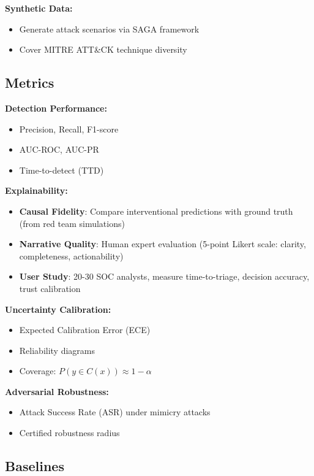 \documentclass[conference]{IEEEtran}
\begin{document}
\textbf{Synthetic Data:}
\begin{itemize}
    \item Generate attack scenarios via SAGA framework \cite{saga}
    \item Cover MITRE ATT\&CK technique diversity
\end{itemize}

\subsection{Metrics}

\textbf{Detection Performance:}
\begin{itemize}
    \item Precision, Recall, F1-score
    \item AUC-ROC, AUC-PR
    \item Time-to-detect (TTD)
\end{itemize}

\textbf{Explainability:}
\begin{itemize}
    \item \textbf{Causal Fidelity}: Compare interventional predictions with ground truth (from red team simulations)
    \item \textbf{Narrative Quality}: Human expert evaluation (5-point Likert scale: clarity, completeness, actionability)
    \item \textbf{User Study}: 20-30 SOC analysts, measure time-to-triage, decision accuracy, trust calibration
\end{itemize}

\textbf{Uncertainty Calibration:}
\begin{itemize}
    \item Expected Calibration Error (ECE)
    \item Reliability diagrams
    \item Coverage: $P(y \in C(x)) \approx 1-\alpha$
\end{itemize}

\textbf{Adversarial Robustness:}
\begin{itemize}
    \item Attack Success Rate (ASR) under mimicry attacks
    \item Certified robustness radius
\end{itemize}

\subsection{Baselines}
\end{document}
